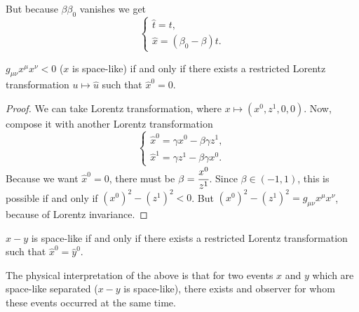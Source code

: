 \documentclass[main.tex]{subfiles}
\begin{document}
But because $\beta\beta_0$ vanishes we get
\begin{equation}
\begin{cases}
\hat{t} =  t, \\
\hat{x} = (\beta_0  - \beta) t. 
\end{cases}
\end{equation}
\begin{fact}
$g_{\mu\nu} x^\mu x^\nu < 0$ ($x$ is space-like) if and only if there exists a restricted Lorentz transformation $u \mapsto \hat{u}$ such that $\hat{x}^0 = 0$.  
\end{fact}
\begin{proof}
We can take Lorentz transformation, where $x \mapsto (x^0, z^1, 0, 0)$. Now, compose it with another Lorentz transformation
\begin{equation}
\begin{cases}
    \hat{x}^0 = \gamma x^0 - \beta \gamma z^1, \\
    \hat{x}^1 = \gamma z^1 -\beta \gamma x^0.
\end{cases}
\end{equation}
Because we want $\hat{x}^0 = 0$, there must be $\beta = \cfrac{x^0}{z^1}$. Since $\beta\in (-1, 1)$, this is possible if and only if $(x^0)^2 - (z^1)^2 < 0$. But $(x^0)^2 - (z^1)^2 = g_{\mu\nu} x^\mu x^\nu$, because of Lorentz invariance.
\end{proof}
\begin{corollary}
$x - y$ is space-like if and only if there exists a restricted Lorentz transformation such that $\hat{x}^0 = \hat{y}^0$.
\end{corollary}

The physical interpretation of the above is that for two events $x$ and $y$ which are space-like separated ($x - y$ is space-like), there exists and observer for whom these events occurred at the same time.
\end{document}
